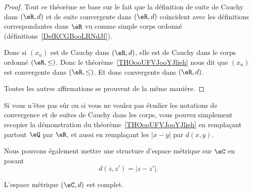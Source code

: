 \begin{proof}
	Tout ce théorème se base sur le fait que la définition de suite de Cauchy dans \( (\eR,d)\) et de suite convergente dans \( (\eR,d)\) coïncident avec les définitions correspondantes dans \( \eR\) vu comme simple corps ordonné (définitions~\ref{DefKCGBooLRNdJf}).

	Donc si \( (x_n)\) est de Cauchy dans \( (\eR,d)\), elle est de Cauchy dans le corps ordonné \( (\eR,\leq)\). Donc le théorème~\ref{THOooUFVJooYJlieh} nous dit que \( (x_n)\) est convergente dans \( (\eR,\leq)\). Et donc convergente dans \( (\eR,d)\).

	Toutes les autres affirmations se prouvent de la même manière.
\end{proof}

Si vous n'êtes pas sûr ou si vous ne voulez pas étudier les notations de convergence et de suites de Cauchy dans les corps, vous pouvez simplement recopier la démonstration du théorème~\ref{THOooUFVJooYJlieh} en remplaçant partout \( \eQ\) par \( \eR\), et aussi en remplaçant les \( | x-y |\) par \( d(x,y)\).

\begin{normaltext}
	Nous pouvons également mettre une structure d'espace métrique sur \( \eC\) en posant
	\begin{equation}
		d(z,z')=| z-z' |.
	\end{equation}
\end{normaltext}

\begin{proposition}
	L'espace métrique \( (\eC,d)\) est complet.
\end{proposition}


